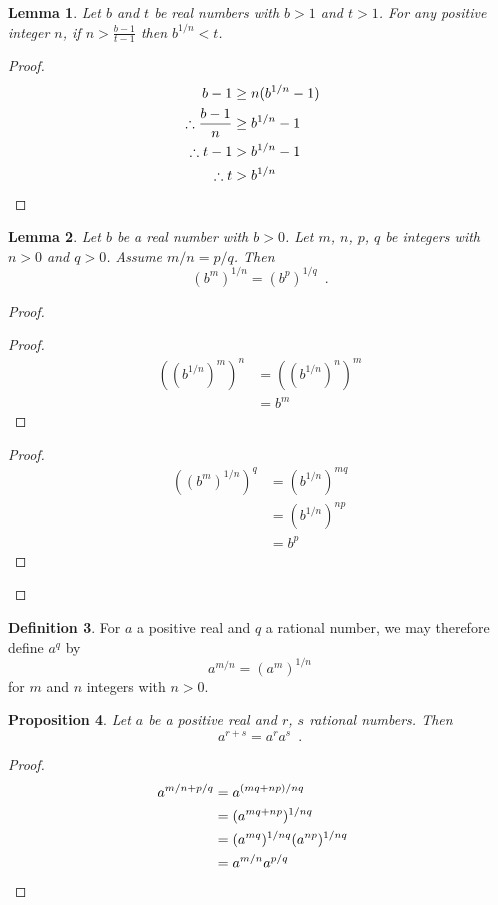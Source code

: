 \documentclass{book}
\let\qed\relax
\newtheorem{prop}{Proposition}[chapter]
\newtheorem{lm}[prop]{Lemma}
\theoremstyle{definition}
\newtheorem{df}[prop]{Definition}
\begin{document}
\begin{lm}
\label{lm:Rudin_1_Exercise_7c}
Let $b$ and $t$ be real numbers with $b > 1$ and $t > 1$. For any positive integer $n$, if $n > \frac{b-1}{t-1}$ then $b^{1/n} < t$.
\end{lm}

\begin{proof}
\pf
\begin{align*}
b-1 & \geq n (b^{1/n} - 1) \\
\therefore \frac{b-1}{n} & \geq b^{1/n} - 1 \\
\therefore t-1 & > b^{1/n} - 1 \\
\therefore t & > b^{1/n} & \qed
\end{align*}
\end{proof}

\begin{lm}
Let $b$ be a real number with $b > 0$. Let $m$, $n$, $p$, $q$ be integers with $n > 0$ and $q > 0$. Assume $m/n = p/q$. Then
\[ (b^m)^{1/n} = (b^p)^{1/q} \enspace . \]
\end{lm}

\begin{proof}
\pf
{}
\begin{proof}
	\pf
	\begin{align*}
		((b^{1/n})^m)^n & = ((b^{1/n})^n)^m \\
		& = b^m
	\end{align*}
\end{proof}
\begin{proof}
	\pf
	\begin{align*}
		((b^m)^{1/n})^q & = (b^{1/n})^{mq} \\
		& = (b^{1/n})^{np} \\
		& = b^p
	\end{align*}
\end{proof}
\qed
\end{proof}

\begin{df}
For $a$ a positive real and $q$ a rational number, we may therefore define $a^q$ by
\[ a^{m/n} = (a^m)^{1/n} \]
for $m$ and $n$ integers with $n > 0$.
\end{df}

\begin{prop}
Let $a$ be a positive real and $r$, $s$ rational numbers. Then
\[ a^{r+s} = a^r a^s \enspace . \]
\end{prop}

\begin{proof}
\pf
\begin{align*}
a^{m/n + p/q} & = a^{(mq+np)/nq} \\
& = (a^{mq+np})^{1/nq} \\
& = (a^{mq})^{1/nq} (a^{np})^{1/nq} \\
& = a^{m/n} a^{p/q} & \qed
\end{align*}
\end{proof}
\end{document}
